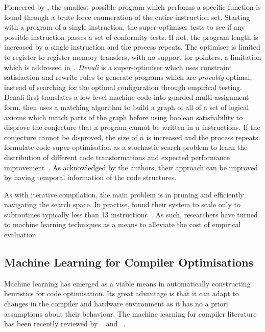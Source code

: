 Pioneered by \citeauthor{Massalin1987}, the smallest possible program which performs a specific function is found through a brute force enumeration of the entire instruction set. Starting with a program of a single instruction, the super-optimiser tests to see if any possible instruction passes a set of conformity tests. If not, the program length is increased by a single instruction and the process repeats. The optimiser is limited to register to register memory transfers, with no support for pointers, a limitation which is addressed in~\cite{Joshi2002}. \emph{Denali} is a super-optimiser which uses constraint satisfaction and rewrite rules to generate programs which are \emph{provably} optimal, instead of searching for the optimal configuration through empirical testing. Denali first translates a low level machine code into guarded multi-assignment form, then uses a matching algorithm to build a graph of all of a set of logical axioms which match parts of the graph before using boolean satisfiability to disprove the conjecture that a program cannot be written in $n$ instructions. If the conjecture cannot be disproved, the size of $n$ is increased and the process repeats.
\citeauthor{Bunel2017a} formulate code super-optimisation as a stochastic search problem to learn the distribution of different code transformations and expected performance improvement~\cite{Bunel2017a}. As acknowledged by the authors, their approach can be improved by having temporal information of the code structures.

As with iterative compilation, the main problem is in pruning and efficiently navigating the search space. In practise, \citeauthor{Massalin1987} found their system to scale only to subroutines typically less than 13 instructions~\cite{Massalin1987}. As such, researchers have turned to machine learning techniques as a means to alleviate the cost of empirical evaluation.


\subsection{Machine Learning for Compiler Optimisations}
\label{subsec:related-work-machine-learning-optimisation}

Machine learning has emerged as a viable means in automatically constructing heuristics for code optimisation. Its great advantage is that it can adapt to changes in the compiler and hardware environment as it has no a priori assumptions about their behaviour.
The machine learning for compiler literature has been recently reviewed by \citeauthor{Ashouri2018}~\cite{Ashouri2018} and
\citeauthor{Zhang2018c}~\cite{Zhang2018c}.

